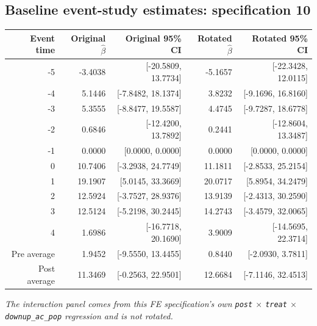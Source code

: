 \documentclass[10pt]{article}
\begin{document}
\subsection*{Baseline event-study estimates: specification 10}
\begin{center}
\scriptsize
\begin{tabular}{r rr rr}
\toprule
Event time & Original $\hat\beta$ & Original 95\% CI & Rotated $\hat\beta$ & Rotated 95\% CI \\
\midrule
-5 & -3.4038 & [-20.5809, 13.7734] & -5.1657 & [-22.3428, 12.0115] \\
-4 & 5.1446 & [-7.8482, 18.1374] & 3.8232 & [-9.1696, 16.8160] \\
-3 & 5.3555 & [-8.8477, 19.5587] & 4.4745 & [-9.7287, 18.6778] \\
-2 & 0.6846 & [-12.4200, 13.7892] & 0.2441 & [-12.8604, 13.3487] \\
-1 & 0.0000 & [0.0000, 0.0000] & 0.0000 & [0.0000, 0.0000] \\
0 & 10.7406 & [-3.2938, 24.7749] & 11.1811 & [-2.8533, 25.2154] \\
1 & 19.1907 & [5.0145, 33.3669] & 20.0717 & [5.8954, 34.2479] \\
2 & 12.5924 & [-3.7527, 28.9376] & 13.9139 & [-2.4313, 30.2590] \\
3 & 12.5124 & [-5.2198, 30.2445] & 14.2743 & [-3.4579, 32.0065] \\
4 & 1.6986 & [-16.7718, 20.1690] & 3.9009 & [-14.5695, 22.3714] \\
\midrule
Pre average & 1.9452 & [-9.5550, 13.4455] & 0.8440 & [-2.0930, 3.7811] \\
Post average & 11.3469 & [-0.2563, 22.9501] & 12.6684 & [-7.1146, 32.4513] \\
\bottomrule
\end{tabular}
\end{center}
\medskip
\textit{The interaction panel comes from this FE specification's own \texttt{post} $\times$ \texttt{treat} $\times$ \texttt{downup\_ac\_pop} regression and is not rotated.}
\clearpage
\end{document}
